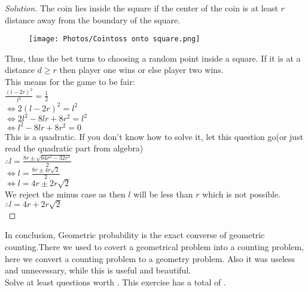 \begin{proof}
    [Solution]
    The coin lies inside the square if the center of the coin is at least $r$ distance away from the boundary of the square.\\
    \begin{figure}[h]
        \centering
        \texttt{[image: Photos/Cointoss onto square.png]}        
    \end{figure}
    Thus, thus the bet turns to choosing a random point inside a square. If it is at a distance $d\geq r$ then player one wins or else player two wins.\\
    This means for the game to be fair:\\
    $\frac{(l-2r)^2}{l^2}=\frac{1}{2}$\\
    $\iff 2(l-2r)^2=l^2$\\
    $\iff 2l^2-8lr+8r^2=l^2$\\
    $ \iff l^2-8lr+8r^2=0$\\
    This is a quadratic. If you don't know how to solve it, let this question go(or just read the quadratic part from algebra)\\
    $\therefore l=\frac{8r\pm\sqrt{64r^2-32r^2}}{2}$\\
    $\iff l=\frac{8r\pm4r\sqrt{2}}{2}$\\
    $\iff l=4r\pm2r\sqrt{2}$\\
    We reject the minus case as then $l$ will be less than $r$ which is not possible.
    $\therefore l=4r+2r\sqrt{2}$\\
\end{proof}
In conclusion, Geometric probability is the exact converse of geometric counting.There we used to covert a geometrical problem into a counting problem, here we convert a counting problem to a geometry problem. Also it was useless and unnecessary, while this is useful and beautiful.\\
Solve at least questions worth . This exercise has a total of .
